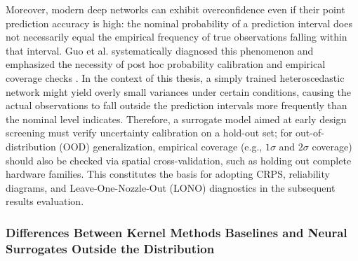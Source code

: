 Moreover, modern deep networks can exhibit overconfidence even if their point prediction accuracy is high:
the nominal probability of a prediction interval does not necessarily equal the empirical frequency of true observations falling within that interval.
Guo et al. systematically diagnosed this phenomenon and emphasized the necessity of post hoc probability calibration and empirical coverage checks \cite{Guo2017Calibration}.
In the context of this thesis, a simply trained heteroscedastic network might yield overly small variances under certain conditions,
causing the actual observations to fall outside the prediction intervals more frequently than the nominal level indicates.
Therefore, a surrogate model aimed at early design screening must verify uncertainty calibration on a hold-out set;
for out-of-distribution (OOD) generalization, empirical coverage (e.g., $1\sigma$ and $2\sigma$ coverage) should also be checked via spatial cross-validation, such as holding out complete hardware families.
This constitutes the basis for adopting CRPS, reliability diagrams, and Leave-One-Nozzle-Out (LONO) diagnostics in the subsequent results evaluation.

\subsubsection{Differences Between Kernel Methods Baselines and Neural Surrogates Outside the Distribution}
\label{sec:kernel-vs-nn-ood-en}

